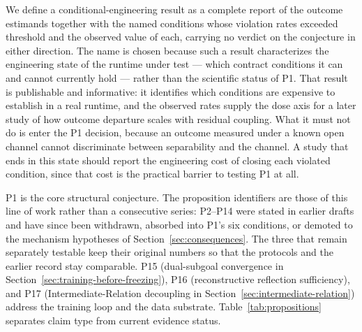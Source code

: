 We define a conditional-engineering result as a complete report of the outcome estimands together with the named conditions whose violation rates exceeded threshold and the observed value of each, carrying no verdict on the conjecture in either direction. The name is chosen because such a result characterizes the engineering state of the runtime under test --- which contract conditions it can and cannot currently hold --- rather than the scientific status of P1. That result is publishable and informative: it identifies which conditions are expensive to establish in a real runtime, and the observed rates supply the dose axis for a later study of how outcome departure scales with residual coupling. What it must not do is enter the P1 decision, because an outcome measured under a known open channel cannot discriminate between separability and the channel. A study that ends in this state should report the engineering cost of closing each violated condition, since that cost is the practical barrier to testing P1 at all.

P1 is the core structural conjecture. The proposition identifiers are those of this line of work rather than a consecutive series: P2--P14 were stated in earlier drafts and have since been withdrawn, absorbed into P1's six conditions, or demoted to the mechanism hypotheses of Section~\ref{sec:consequences}. The three that remain separately testable keep their original numbers so that the protocols and the earlier record stay comparable. P15 (dual-subgoal convergence in Section~\ref{sec:training-before-freezing}), P16 (reconstructive reflection sufficiency), and P17 (Intermediate-Relation decoupling in Section~\ref{sec:intermediate-relation}) address the training loop and the data substrate. Table~\ref{tab:propositions} separates claim type from current evidence status.

